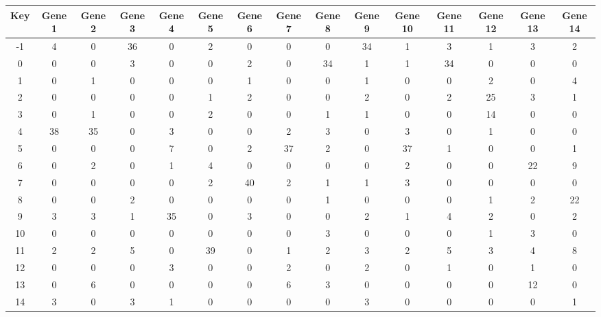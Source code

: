 \begin{tabular}{|c|c|c|c|c|c|c|c|c|c|c|c|c|c|c|}
\hline
Key & Gene 1 & Gene 2 & Gene 3 & Gene 4 & Gene 5 & Gene 6 & Gene 7 & Gene 8 & Gene 9 & Gene 10 & Gene 11 & Gene 12 & Gene 13 & Gene 14 \\
\hline
-1 & 4 & 0 & 36 & 0 & 2 & 0 & 0 & 0 & 34 & 1 & 3 & 1 & 3 & 2 \\
0 & 0 & 0 & 3 & 0 & 0 & 2 & 0 & 34 & 1 & 1 & 34 & 0 & 0 & 0 \\
1 & 0 & 1 & 0 & 0 & 0 & 1 & 0 & 0 & 1 & 0 & 0 & 2 & 0 & 4 \\
2 & 0 & 0 & 0 & 0 & 1 & 2 & 0 & 0 & 2 & 0 & 2 & 25 & 3 & 1 \\
3 & 0 & 1 & 0 & 0 & 2 & 0 & 0 & 1 & 1 & 0 & 0 & 14 & 0 & 0 \\
4 & 38 & 35 & 0 & 3 & 0 & 0 & 2 & 3 & 0 & 3 & 0 & 1 & 0 & 0 \\
5 & 0 & 0 & 0 & 7 & 0 & 2 & 37 & 2 & 0 & 37 & 1 & 0 & 0 & 1 \\
6 & 0 & 2 & 0 & 1 & 4 & 0 & 0 & 0 & 0 & 2 & 0 & 0 & 22 & 9 \\
7 & 0 & 0 & 0 & 0 & 2 & 40 & 2 & 1 & 1 & 3 & 0 & 0 & 0 & 0 \\
8 & 0 & 0 & 2 & 0 & 0 & 0 & 0 & 1 & 0 & 0 & 0 & 1 & 2 & 22 \\
9 & 3 & 3 & 1 & 35 & 0 & 3 & 0 & 0 & 2 & 1 & 4 & 2 & 0 & 2 \\
10 & 0 & 0 & 0 & 0 & 0 & 0 & 0 & 3 & 0 & 0 & 0 & 1 & 3 & 0 \\
11 & 2 & 2 & 5 & 0 & 39 & 0 & 1 & 2 & 3 & 2 & 5 & 3 & 4 & 8 \\
12 & 0 & 0 & 0 & 3 & 0 & 0 & 2 & 0 & 2 & 0 & 1 & 0 & 1 & 0 \\
13 & 0 & 6 & 0 & 0 & 0 & 0 & 6 & 3 & 0 & 0 & 0 & 0 & 12 & 0 \\
14 & 3 & 0 & 3 & 1 & 0 & 0 & 0 & 0 & 3 & 0 & 0 & 0 & 0 & 1 \\
\hline
\end{tabular}